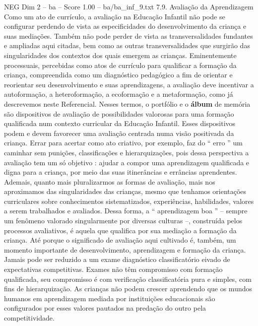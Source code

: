 \begin{textsample}{NEG Dim 2 – ba – Score 1.00 – ba/ba\_inf\_9.txt}  \label{ex:f2_neg_259}
7.9.
Avaliação da Aprendizagem Como um ato de currículo, a avaliação na Educação Infantil não pode se configurar perdendo de vista as especificidades do desenvolvimento da criança e suas mediações.
Também não pode perder de vista as transversalidades fundantes e ampliadas aqui citadas, bem como as outras transversalidades que surgirão das singularidades dos contextos dos quais emergem as crianças.
Eminentemente processuais, percebidas como atos de currículo para qualificar a formação da criança, compreendida como um diagnóstico pedagógico a fim de orientar e reorientar seu desenvolvimento e suas aprendizagens, a avaliação deve incentivar a autoformação, a heteroformação, a ecoformação e a metaformação, como já descrevemos neste Referencial.
Nesses termos, o portfólio e o \textbf{álbum} de memória são dispositivos de avaliação de possibilidades valorosas para uma formação qualificada num contexto curricular da Educação Infantil.
Esses dispositivos podem e devem favorecer uma avaliação centrada numa visão positivada da criança.
Errar para acertar como ato criativo, por exemplo, faz do “ erro ” um caminhar sem punições, classificações e hierarquizações, pois dessa perspectiva a avaliação tem um só objetivo : ajudar a compor uma aprendizagem qualificada e digna para a criança, por meio das suas itinerâncias e errâncias aprendentes.
Ademais, quanto mais pluralizarmos as formas de avaliação, mais nos aproximamos das singularidades das crianças, mesmo que tenhamos orientações curriculares sobre conhecimentos sistematizados, experiências, habilidades, valores a serem trabalhados e avaliados.
Dessa forma, a “ aprendizagem boa ” – sempre um fenômeno valorado singularmente por diversas culturas –, construída pelos processos avaliativos, é aquela que qualifica por sua mediação a formação da criança.
Até porque o significado de avaliação aqui cultivado é, também, um momento importante de desenvolvimento, aprendizagem e formação da criança.
Jamais pode ser reduzido a um exame diagnóstico classificatório eivado de expectativas competitivas.
Exames não têm compromisso com formação qualificada, seu compromisso é com verificação classificatória pura e simples, com fins de hierarquização.
As crianças não podem crescer aprendendo que os mundos humanos em aprendizagem mediada por instituições educacionais são configurados por esses valores pautados na predação do outro pela competitividade.

\end{textsample}

